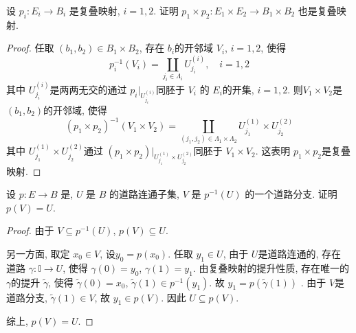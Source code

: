 \documentclass[../main.tex]{subfiles}
\begin{document}
\begin{exercise}{}{}
设 $p_i : E_i \to B_i$ 是复叠映射, $i=1, 2$. 证明 $p_1 \times p_2 : E_1 \times E_2 \to B_1 \times B_2$ 也是复叠映射.
\end{exercise}
\begin{proof}
    任取 \(  \left( b_1,b_2 \right)\in B_1\times B_2   \), 存在 \(  b_{i}  \)的开邻域 \(  V_{i}  \), \(  i= 1,2  \), 使得 \[
    p_{i}^{-1} \left( V_{i} \right)= \coprod  _{j_{i}\in  \Lambda _{i}}U^{\left( i \right) }_{j_{i}} ,\quad i= 1,2
    \] 其中 \(  U^{\left( i \right) }_{j_{i}}  \)是两两无交的通过 \(  p_{i}|_{U_{j_{i}}^{\left( i \right) }}  \)同胚于 \(  V_{i}  \) 的 \(  E_{i}  \)的开集, \(  i= 1,2  \). 则\(  V_1\times V_2  \)是 \(  \left( b_1,b_2 \right)   \)的开邻域, 使得   \[
    \left( p_1\times p_2 \right)^{-1} \left( V_1\times V_2 \right)  = \coprod  _{\left( j_1,j_2 \right)\in  \Lambda _{1}\times  \Lambda _{2} } U_{j_1}^{\left( 1 \right) }\times U_{j_2}^{\left( 2 \right) }
    \]  其中 \(  U_{j_1}^{\left( 1 \right) }\times U_{j_2}^{\left( 2 \right) }  \)通过 \(  \left( p_1\times p_2 \right)|_{U_{j_1}^{\left( 1 \right) }\times U_{j_2}^{\left( 2 \right) }}   \)同胚于 \(  V_1\times V_2  \).   这表明 \(  p_1\times p_2  \)是复叠映射. 
\end{proof}
\begin{exercise}{}{}
设 $p: E \to B$ 是, $U$ 是 $B$ 的道路连通子集, $V$ 是 $p^{-1}(U)$ 的一个道路分支. 证明 $p(V)=U$.
\end{exercise}

\begin{proof}
    由于 \(  V\subseteq p^{-1} \left( U \right)   \), \(  p\left( V \right)\subseteq U   \).
    
    另一方面, 取定 \(  x_0\in V  \), 设\(  y_0= p\left( x_0 \right)   \). 任取 \(  y_1 \in U  \), 由于 \(  U  \)是道路连通的, 存在 道路 \(   \gamma :\mathbb{I}\to U  \), 使得 \(   \gamma \left( 0 \right)= y_0   \), \(   \gamma \left( 1 \right)= y_1   \). 由复叠映射的提升性质, 存在唯一的 \(   \gamma  \)的提升 \(   \tilde{\gamma}   \), 使得 \(   \tilde{\gamma} \left( 0 \right)= x_0   \), \(   \tilde{\gamma} \left( 1 \right)\in p^{-1} \left( y_1 \right)    \). 故 \(  y_1= p\left(  \tilde{\gamma} \left( 1 \right)  \right)   \)          . 由于 \(  V  \)是道路分支,  \(   \tilde{\gamma} \left( 1 \right)\in V   \), 故 \(  y_1\in p\left( V \right)   \). 因此 \(  U\subseteq p\left( V \right)   \). 
    
    综上,  \(  p\left( V \right)= U   \). 
\end{proof}
\end{document}
